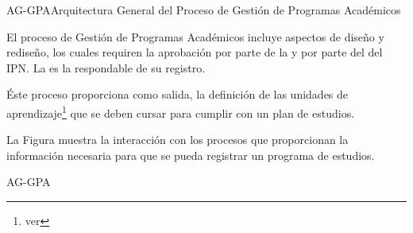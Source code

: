 


\begin{Arquitectura}{AG-GPA}{Arquitectura General del Proceso de Gestión de Programas Académicos} {
		
		El proceso de Gestión de Programas Académicos incluye aspectos de diseño y rediseño, los cuales requiren la aprobación por parte de la  y por parte del  del IPN. La  es la respondable de su registro. 
		
		Éste proceso proporciona como salida, la definición de las unidades de aprendizaje\footnote{ver } que se deben cursar para cumplir con un plan de estudios.
		
		\noindent La Figura  muestra la interacción con los procesos que proporcionan la información necesaria para que se pueda registrar un programa de estudios.

		
	}{AG-GPA}

\end{Arquitectura}

